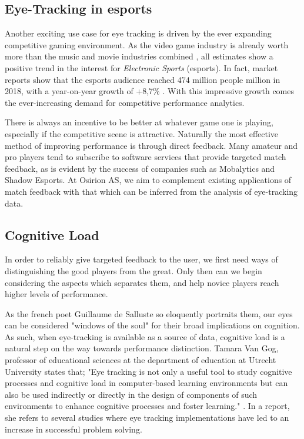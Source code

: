\subsection{Eye-Tracking in esports}

Another exciting use case for eye tracking is driven by the ever expanding competitive gaming environment. As the video game industry is already worth more than the music and movie industries combined \cite{mangeloja2019}, all estimates show a positive trend in the interest for \textit{Electronic Sports} (esports). In fact, market reports show that the esports audience reached 474 million people million in 2018, with a year-on-year growth of +8,7\% \cite{newzoo2021}. With this impressive growth comes the ever-increasing demand for competitive performance analytics.

There is always an incentive to be better at whatever game one is playing, especially if the competitive scene is attractive. Naturally the most effective method of improving performance is through direct feedback. Many amateur and pro players tend to subscribe to software services that provide targeted match feedback, as is evident by the success of companies such as Mobalytics and Shadow Esports. At Osirion AS, we aim to complement existing applications of match feedback with that which can be inferred from the analysis of eye-tracking data.

\subsection{Cognitive Load}

In order to reliably give targeted feedback to the user, we first need ways of distinguishing the good players from the great. Only then can we begin considering the aspects which separates them, and help novice players reach higher levels of performance.

As the french poet Guillaume de Salluste so eloquently portraits them, our eyes can be considered "windows of the soul" \cite{hess1965} for their broad implications on cognition. As such, when eye-tracking is available as a source of data, cognitive load is a natural step on the way towards performance distinction. Tamara Van Gog, professor of educational sciences at the department of education at Utrecht University states that; "Eye tracking is not only a useful tool to study cognitive processes and cognitive load in computer-based learning environments but can also be used indirectly or directly in the design of components of such environments to enhance cognitive processes and foster learning." \cite{vanGog2013}. In a report, she refers to several studies where eye tracking implementations have led to an increase in successful problem solving.

